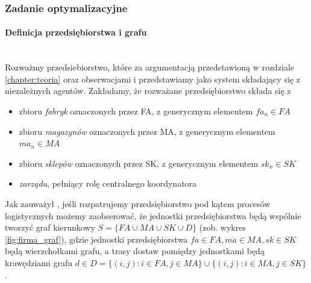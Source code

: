 \documentclass[polish, twoside, 12pt, a4paper]{article}
\theoremstyle{definition}
\theoremstyle{plain}
\theoremstyle{remark}
\begin{document}
\newpage

\subsubsection{Zadanie optymalizacyjne} \label{chapter:zadanie}
\paragraph{Definicja przedsiębiorstwa i grafu}\mbox{}\\

Rozważmy przedsiebiorstwo, które za argumentacją przedstawioną w rozdziale \ref{chapter:teoria} oraz obserwacjami  \cite{Moyaux2006} i \cite{Kawa2010} przedstawiamy jako system składający się z niezależnych agentów. Zakładamy, że rozważane przedsiębiorstwo składa się z 

	\begin{itemize} 
		\item zbioru \textit{fabryk} oznaczonych przez FA, z generycznym elementem $fa_n \in FA$
		\item zbioru \textit{magazynów} oznaczonych przez MA, z generycznym elementem $ma_n \in MA$
		\item zbioru \textit{sklepów} oznaczonych przez SK, z generycznym elementem $sk_n \in SK$
		\item \textit{zarządu}, pełniący rolę centralnego koordynatora
	\end{itemize}

Jak zauważył \cite{Kawa2010}, jeśli rozpatrujemy przedsiębiorstwo pod kątem procesów logistycznych możemy zaobserować, że jednostki przedsiębiorstwa będą wspólnie tworzyć graf kierunkowy $S = \{FA \cup MA \cup SK \cup D\}$ (zob. wykres \ref{fig:firma_graf}), gdzie jednostki przedsiębiorstwa $fa \in FA, ma \in MA, sk \in SK$ będą wierzchołkami grafu, a trasy dostaw pomiędzy jednostkami będą krawędziami grafu  $d \in D = \{(i,j) : i \in FA, j \in MA\} \cup \{(i,j) : i \in MA, j \in SK\}$. 
\end{document}
